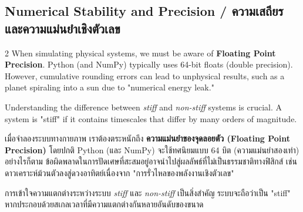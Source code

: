 \subsection{Numerical Stability and Precision \quad / \quad \textthai{ความเสถียรและความแม่นยำเชิงตัวเลข}}
\begin{paracol}{2}
When simulating physical systems, we must be aware of \textbf{Floating Point Precision}. Python (and NumPy) typically uses 64-bit floats (double precision). However, cumulative rounding errors can lead to unphysical results, such as a planet spiraling into a sun due to "numerical energy leak."

Understanding the difference between \textit{stiff} and \textit{non-stiff} systems is crucial. A system is "stiff" if it contains timescales that differ by many orders of magnitude. 

\switchcolumn

\begin{thai}
เมื่อจำลองระบบทางกายภาพ เราต้องตระหนักถึง \textbf{ความแม่นยำของจุดลอยตัว (Floating Point Precision)} โดยปกติ Python (และ NumPy) จะใช้ทศนิยมแบบ 64 บิต (ความแม่นยำสองเท่า) อย่างไรก็ตาม ข้อผิดพลาดในการปัดเศษที่สะสมอยู่อาจนำไปสู่ผลลัพธ์ที่ไม่เป็นธรรมชาติทางฟิสิกส์ เช่น ดาวเคราะห์ม้วนตัวลงสู่ดวงอาทิตย์เนื่องจาก "การรั่วไหลของพลังงานเชิงตัวเลข"

การเข้าใจความแตกต่างระหว่างระบบ \textit{stiff} และ \textit{non-stiff} เป็นสิ่งสำคัญ ระบบจะถือว่าเป็น "stiff" หากประกอบด้วยสเกลเวลาที่มีความแตกต่างกันหลายอันดับของขนาด
\end{thai}
\end{paracol}
